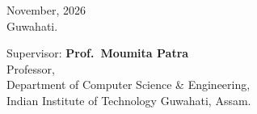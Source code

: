 \documentclass[12pt,a4paper,oneside]{report}
\newcommand{\supervisorname}{Prof.\ Moumita Patra}
\newcommand{\departmentname}{Department of Computer Science \& Engineering}
\newcommand{\institutename}{Indian Institute of Technology Guwahati}
\newcommand{\submissiondate}{November, 2026}
\newcommand{\submissionplace}{Guwahati}
\begin{document}
\vspace{3cm}
\noindent
{\singlespacing\noindent
\begin{minipage}[b]{0.35\textwidth}
  \raggedright
  \submissiondate\\[0.25cm]
  \submissionplace.
\end{minipage}\hfill
\begin{minipage}[b]{0.60\textwidth}
  \raggedleft
  Supervisor: \textbf{\supervisorname}\\[0.35cm]
  Professor,\\[0.1cm]
  \departmentname,\\[0.1cm]
  \institutename, Assam.
\end{minipage}
}
\clearpage

\clearpage

\clearpage

\tableofcontents
\clearpage
\listoffigures
{}
\clearpage
\listoftables
{}
\clearpage


\clearpage
{}








\clearpage
{}
{\footnotesize


}
\end{document}
